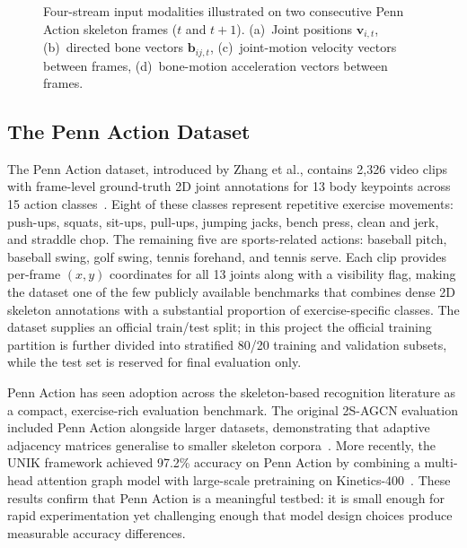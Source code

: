 \begin{figure}[ht]
\caption{Four-stream input modalities illustrated on two consecutive Penn Action skeleton frames ($t$ and $t{+}1$). (a)~Joint positions $\mathbf{v}_{i,t}$, (b)~directed bone vectors $\mathbf{b}_{ij,t}$, (c)~joint-motion velocity vectors between frames, (d)~bone-motion acceleration vectors between frames.}
\label{fig:four-streams}
\end{figure}

\subsection{The Penn Action Dataset}
The Penn Action dataset, introduced by Zhang et al., contains 2,326 video clips with frame-level ground-truth 2D joint annotations for 13 body keypoints across 15 action classes~\cite{zhang2013actemes}. Eight of these classes represent repetitive exercise movements: push-ups, squats, sit-ups, pull-ups, jumping jacks, bench press, clean and jerk, and straddle chop. The remaining five are sports-related actions: baseball pitch, baseball swing, golf swing, tennis forehand, and tennis serve. Each clip provides per-frame $(x, y)$ coordinates for all 13 joints along with a visibility flag, making the dataset one of the few publicly available benchmarks that combines dense 2D skeleton annotations with a substantial proportion of exercise-specific classes. The dataset supplies an official train/test split; in this project the official training partition is further divided into stratified 80/20 training and validation subsets, while the test set is reserved for final evaluation only.

Penn Action has seen adoption across the skeleton-based recognition literature as a compact, exercise-rich evaluation benchmark. The original 2S-AGCN evaluation included Penn Action alongside larger datasets, demonstrating that adaptive adjacency matrices generalise to smaller skeleton corpora~\cite{shi2019two}. More recently, the UNIK framework achieved 97.2\% accuracy on Penn Action by combining a multi-head attention graph model with large-scale pretraining on Kinetics-400~\cite{yang2021unik}. These results confirm that Penn Action is a meaningful testbed: it is small enough for rapid experimentation yet challenging enough that model design choices produce measurable accuracy differences.

